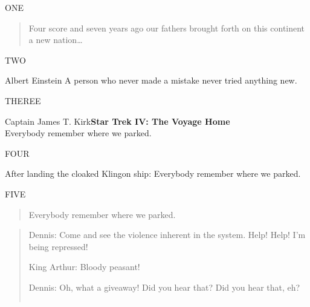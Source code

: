 ONE


\begin{quotation}
Four score and seven years ago our fathers brought forth
on this continent a new nation…​
\end{quotation}

TWO


\begin{aquote}{Albert Einstein}{}
A person who never made a mistake never tried anything new.
\end{aquote}

THEREE


\begin{aquote}{Captain James T. Kirk}{{\bf Star Trek IV: The Voyage Home} \\}
Everybody remember where we parked.
\end{aquote}

FOUR


\begin{tquote}{After landing the cloaked Klingon ship:}
Everybody remember where we parked.
\end{tquote}

FIVE


\begin{quotation}
Everybody remember where we parked.
\end{quotation}

\begin{quotation}
Dennis: Come and see the violence inherent in the system. Help! Help! I’m being repressed!


King Arthur: Bloody peasant!


Dennis: Oh, what a giveaway! Did you hear that? Did you hear that, eh?


\begin{verbatim}

\end{verbatim}
\end{quotation}

